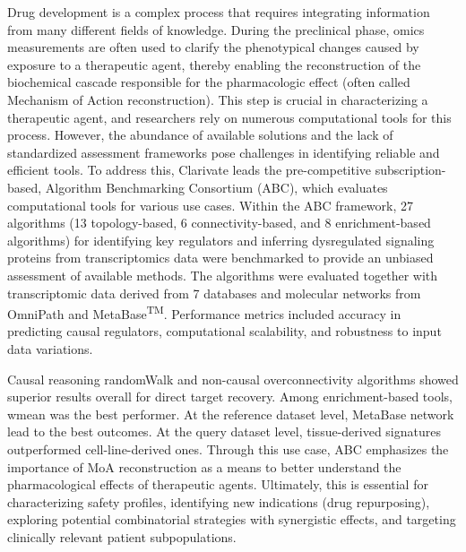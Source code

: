 ﻿%

%

Drug development is a complex process that requires integrating information from many different fields of knowledge.
During the preclinical phase, omics measurements are often used to clarify the phenotypical changes caused by exposure to a therapeutic agent, thereby enabling the reconstruction of the biochemical cascade responsible for the pharmacologic effect (often called Mechanism of Action reconstruction).
This step is crucial in characterizing a therapeutic agent, and researchers rely on numerous computational tools for this process.
However, the abundance of available solutions and the lack of standardized assessment frameworks pose challenges in identifying reliable and efficient tools.
To address this, Clarivate leads the pre-competitive subscription-based, Algorithm Benchmarking Consortium (ABC), which evaluates computational tools for various use cases.
Within the ABC framework, 27 algorithms (13 topology-based, 6 connectivity-based, and 8 enrichment-based algorithms) for identifying key regulators and inferring dysregulated signaling proteins from transcriptomics data were benchmarked to provide an unbiased assessment of available methods.
The algorithms were evaluated together with transcriptomic data derived from 7 databases and molecular networks from OmniPath and  MetaBase\textsuperscript{TM}.
Performance metrics included accuracy in predicting causal regulators, computational scalability, and robustness to input data variations.

Causal reasoning randomWalk and non-causal overconnectivity algorithms showed superior results overall for direct target recovery. Among enrichment-based tools, wmean was the best performer.
At the reference dataset level, MetaBase network lead to the best outcomes. At the query dataset level, tissue-derived signatures outperformed cell-line-derived ones.
Through this use case, ABC emphasizes the importance of MoA reconstruction as a means to better understand the pharmacological effects of therapeutic agents.
Ultimately, this is essential for characterizing safety profiles, identifying new indications (drug repurposing), exploring potential combinatorial strategies with synergistic effects, and targeting clinically relevant patient subpopulations.


